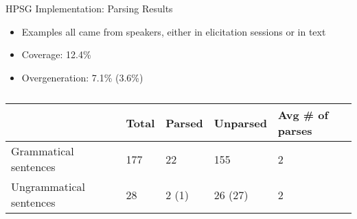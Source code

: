 \begin{frame}{HPSG Implementation: Parsing Results}

\begin{itemize}
\item Examples all came from speakers, either in elicitation sessions or in text
\item Coverage: 12.4\%
\item Overgeneration: 7.1\% (3.6\%)
\end{itemize}

\begin{table}[]
\centering
\caption{}
\label{tab:my-table}
\begin{tabular}{l|llll}
 & Total & Parsed & Unparsed & Avg \# of parses \\ \hline
Grammatical sentences & 177 & 22 & 155 & 2 \\ \hline
Ungrammatical sentences & 28 & 2 (1) & 26 (27) & 2
\end{tabular}
\end{table}
	
\end{frame}
